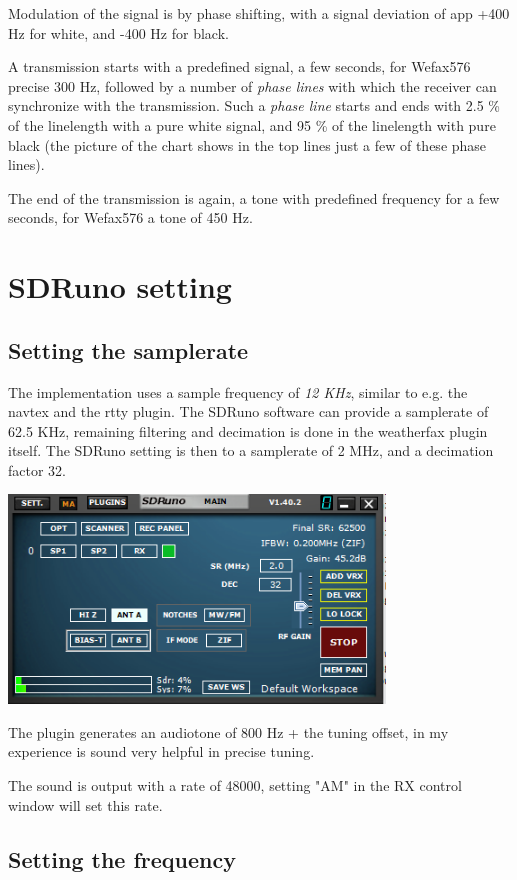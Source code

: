 \documentclass[11pt]{article}
\begin{document}
Modulation of the signal is by phase shifting, with a signal deviation of
app  +400 Hz for white, and -400 Hz for black.

A transmission starts with a predefined signal, a few seconds, for Wefax576
precise 300 Hz,
followed by a number of {\em phase lines} with which the receiver can synchronize
with the transmission.
Such a {\em phase line} starts and ends with 2.5 \% of the linelength
with a pure white signal, and 95 \% of the linelength with pure black
(the picture of the chart shows in the top lines just a few of these
phase lines).

The end of the transmission is again, a tone with predefined frequency for
a few seconds, for Wefax576 a tone of 450 Hz.

\section{SDRuno setting}
\subsection{Setting the samplerate}
The implementation uses a sample frequency of {\em 12 KHz},
similar to e.g. the navtex and the rtty plugin.
The SDRuno software can provide a samplerate
of 62.5 KHz, remaining filtering and decimation is done in
the weatherfax plugin itself.
The SDRuno setting is then to a samplerate of 2 MHz, and a decimation factor
32.

\includegraphics[width=100mm]{main-widget.png}

The plugin generates an audiotone of 800 Hz + the tuning offset, in my
experience is sound very helpful in precise tuning.

The sound is output with a rate of 48000, setting "AM" in the RX control window
will set this rate.

\subsection{Setting the frequency}
\end{document}
